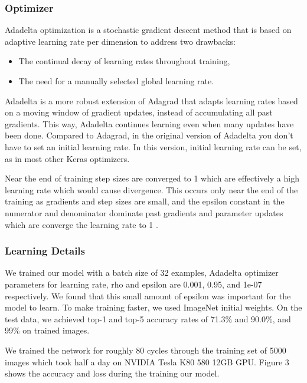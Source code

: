 \documentclass[conference]{IEEEtran}
\begin{document}
\subsubsection{Optimizer}
Adadelta optimization is a stochastic gradient descent method that is based on adaptive learning rate per dimension to address two drawbacks:

\begin{itemize}
  \item The continual decay of learning rates throughout training,
  \item The need for a manually selected global learning rate.
\end{itemize}\par

Adadelta is a more robust extension of Adagrad that adapts learning rates based on a moving window of gradient updates, instead of accumulating all past gradients. This way, Adadelta continues learning even when many updates have been done. Compared to Adagrad, in the original version of Adadelta you don't have to set an initial learning rate. In this version, initial learning rate can be set, as in most other Keras optimizers.
\par
Near the end of training step sizes are converged to 1 which are effectively a high learning rate which would cause divergence. This occurs only near the end of the training as gradients and step sizes are small, and the epsilon constant in the numerator and denominator dominate past gradients and parameter updates which are converge the learning rate to 1 \cite{zeiler2012adadelta}.

\subsubsection{Learning Details}
We trained our model with a batch size of 32 examples, Adadelta optimizer parameters for learning rate, rho and epsilon are 0.001, 0.95, and 1e-07 respectively. We found that this small amount of epsilon was important for the model to learn. To make training faster, we used ImageNet initial weights. On the test data, we achieved top-1 and top-5 accuracy rates of 71.3\% and 90.0\%, and 99\% on trained images. 
\par
We trained the network for roughly 80 cycles through the training set of 5000 images which took half a day on NVIDIA Tesla K80 580 12GB GPU. Figure 3 shows the accuracy and loss during the training our model.
\end{document}
